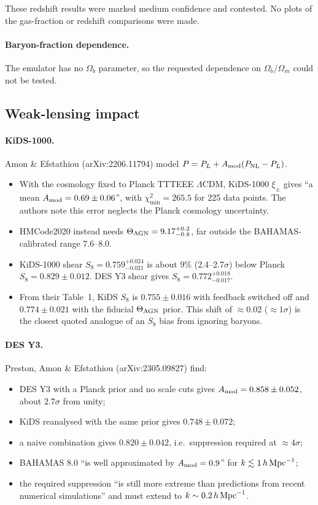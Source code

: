 \documentclass[11pt,a4paper]{article}
\begin{document}
These redshift results were marked medium confidence and contested. No plots of the gas-fraction or redshift comparisons were made.

\paragraph{Baryon-fraction dependence.} The emulator has no $\Omega_b$ parameter, so the requested dependence on $\Omega_b/\Omega_m$ could not be tested.

\subsection{Weak-lensing impact}
\paragraph{KiDS-1000.} Amon \& Efstathiou (arXiv:2206.11794) model $P=P_L+A_{\rm mod}(P_{\rm NL}-P_L)$.
\begin{itemize}
\item With the cosmology fixed to Planck TTTEEE $\Lambda$CDM, KiDS-1000 $\xi_\pm$ gives ``a mean $A_{\rm mod}=0.69\pm0.06$'', with $\chi^2_{\min}=265.5$ for 225 data points. The authors note this error neglects the Planck cosmology uncertainty.
\item HMCode2020 instead needs $\Theta_{\rm AGN}=9.17^{+0.2}_{-0.8}$, far outside the BAHAMAS-calibrated range 7.6--8.0.
\item KiDS-1000 shear $S_8=0.759^{+0.024}_{-0.021}$ is about 9\% (2.4--2.7$\sigma$) below Planck $S_8=0.829\pm0.012$. DES Y3 shear gives $S_8=0.772^{+0.018}_{-0.017}$.
\item From their Table~1, KiDS $S_8$ is $0.755\pm0.016$ with feedback switched off and $0.774\pm0.021$ with the fiducial $\Theta_{\rm AGN}$ prior. This shift of $\approx0.02$ ($\approx1\sigma$) is the closest quoted analogue of an $S_8$ bias from ignoring baryons.
\end{itemize}

\paragraph{DES Y3.} Preston, Amon \& Efstathiou (arXiv:2305.09827) find:
\begin{itemize}
\item DES Y3 with a Planck prior and no scale cuts gives $A_{\rm mod}=0.858\pm0.052$, about $2.7\sigma$ from unity;
\item KiDS reanalysed with the same prior gives $0.748\pm0.072$;
\item a naive combination gives $0.820\pm0.042$, i.e.\ suppression required at $\approx4\sigma$;
\item BAHAMAS 8.0 ``is well approximated by $A_{\rm mod}=0.9$'' for $k\lesssim1\,h\,{\rm Mpc}^{-1}$;
\item the required suppression ``is still more extreme than predictions from recent numerical simulations'' and must extend to $k\sim0.2\,h\,{\rm Mpc}^{-1}$.
\end{itemize}
\end{document}
